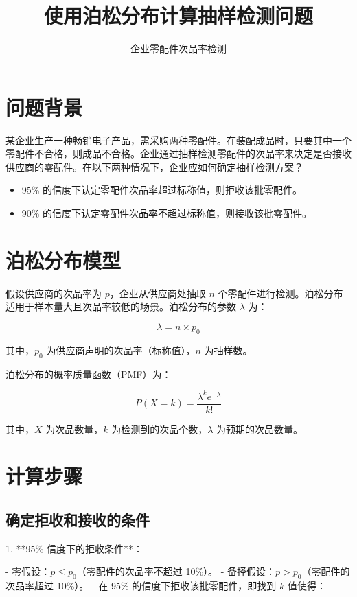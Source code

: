\documentclass{article}
\title{使用泊松分布计算抽样检测问题}
\author{企业零配件次品率检测}
\date{}
\begin{document}
\maketitle

\section{问题背景}
某企业生产一种畅销电子产品，需采购两种零配件。在装配成品时，只要其中一个零配件不合格，则成品不合格。企业通过抽样检测零配件的次品率来决定是否接收供应商的零配件。在以下两种情况下，企业应如何确定抽样检测方案？

\begin{itemize}
    \item 95\% 的信度下认定零配件次品率超过标称值，则拒收该批零配件。
    \item 90\% 的信度下认定零配件次品率不超过标称值，则接收该批零配件。
\end{itemize}

\section{泊松分布模型}
假设供应商的次品率为 \( p \)，企业从供应商处抽取 \( n \) 个零配件进行检测。泊松分布适用于样本量大且次品率较低的场景。泊松分布的参数 \( \lambda \) 为：

\[
\lambda = n \times p_0
\]

其中，\( p_0 \) 为供应商声明的次品率（标称值），\( n \) 为抽样数。

泊松分布的概率质量函数（PMF）为：

\[
P(X = k) = \frac{\lambda^k e^{-\lambda}}{k!}
\]

其中，\( X \) 为次品数量，\( k \) 为检测到的次品个数，\( \lambda \) 为预期的次品数量。

\section{计算步骤}

\subsection{确定拒收和接收的条件}

1. **95\% 信度下的拒收条件**：

    - 零假设：\( p \leq p_0 \)（零配件的次品率不超过 10\%）。
    - 备择假设：\( p > p_0 \)（零配件的次品率超过 10\%）。
    - 在 95\% 的信度下拒收该批零配件，即找到 \( k \) 值使得：
    
\end{document}
